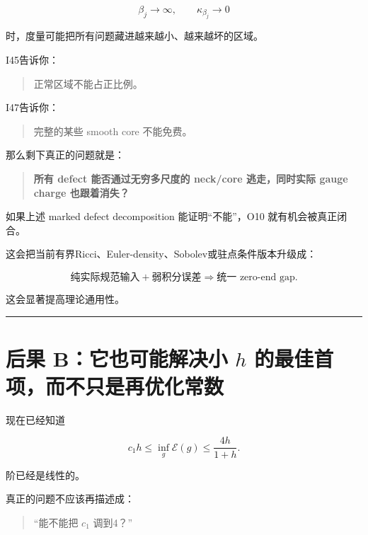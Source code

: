 \documentclass[
  10pt,
]{article}
\begin{document}
\[
\beta_j\to\infty,\qquad
\kappa_{\beta_j}\to0
\]

时，度量可能把所有问题藏进越来越小、越来越坏的区域。

I45告诉你：

\begin{quote}
正常区域不能占正比例。
\end{quote}

I47告诉你：

\begin{quote}
完整的某些 smooth core 不能免费。
\end{quote}

那么剩下真正的问题就是：

\begin{quote}
\textbf{所有 defect 能否通过无穷多尺度的 neck/core 逃走，同时实际 gauge
charge 也跟着消失？}
\end{quote}

如果上述 marked defect decomposition 能证明``不能''，O10
就有机会被真正闭合。

这会把当前有界Ricci、Euler-density、Sobolev或驻点条件版本升级成：

\[
\boxed{
\text{纯实际规范输入}
+
\text{弱积分误差}
\Longrightarrow
\text{统一 zero-end gap}.
}
\]

这会显著提高理论通用性。

\begin{center}\rule{0.5\linewidth}{0.5pt}\end{center}

\hypertarget{ux540eux679c-bux5b83ux4e5fux53efux80fdux89e3ux51b3ux5c0f-h-ux7684ux6700ux4f73ux9996ux9879ux800cux4e0dux53eaux662fux518dux4f18ux5316ux5e38ux6570}{%
\section{\texorpdfstring{后果 B：它也可能解决小 \(h\)
的最佳首项，而不只是再优化常数}{后果 B：它也可能解决小 h 的最佳首项，而不只是再优化常数}}\label{ux540eux679c-bux5b83ux4e5fux53efux80fdux89e3ux51b3ux5c0f-h-ux7684ux6700ux4f73ux9996ux9879ux800cux4e0dux53eaux662fux518dux4f18ux5316ux5e38ux6570}}

现在已经知道

\[
c_1h\le\inf_g\mathcal E(g)
\le\frac{4h}{1+h}.
\]

阶已经是线性的。

真正的问题不应该再描述成：

\begin{quote}
``能不能把 \(c_1\) 调到4？''
\end{quote}
\end{document}
